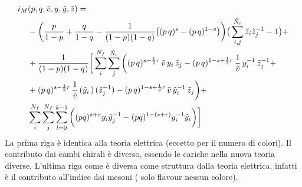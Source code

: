 \documentclass[a4paper,12pt]{report}
\begin{document}
\begin{align*}
 i_M &(p,q, \tilde v, y,\tilde y ,\tilde z) = \\ 
& -\bigg({p \over 1-p}+{q \over 1-q} -{1 \over (1-p)(1-q)} \big((p\,q)^{s}- (p\,q)^{1-s}\big)
\bigg) \big( \sum_{i,j}^{\tilde N_c} \tilde z_i \tilde z_j^{-1} -1\big ) + \\ 
& +{1\over (1-p)(1-q)}\bigg[ \sum_i^{N_f}\sum_j^{\tilde N_c} \bigg( (p\,q)^{s - {1\over 2}r} \,\tilde v \, y_i\, \tilde z_j
- (p\,q)^{1- s + {1\over 2}r} \, {1 \over \tilde v}\, y_i^{-1} \,   
\tilde z_j^{-1} + \\
& + (p\,q)^{s - {1\over 2}r}\, {1\over \tilde v}\, 
({\tilde y_i}\,) \,  
(\tilde z_j^{-1})
- (p\,q)^{1- s +  {1\over 2}r} \, \tilde v \, 
{\tilde y_i}^{-1} \, 
\tilde z_j \bigg) + \\
 &\sum_i^{N_f} \sum_j^{N_f} \sum_{l=0}^{k-1}   \bigg(  (pq)^{  s +r } y_i \tilde y_j^{-1}   - (pq)^{1 -( s +r )}
y_i^{-1}  {\tilde y_i}  \bigg) \bigg] \\
\end{align*}
La prima riga è identica alla teoria elettrica (eccetto per il numero di colori).
Il contributo dai cambi chirali è diverso, essendo le cariche nella nuova teoria diverse.
L'ultima riga come è diversa come struttura dalla teoria elettrica, infatti è il contributo all'indice dai mesoni ( solo flavour nessun colore).
\end{document}
